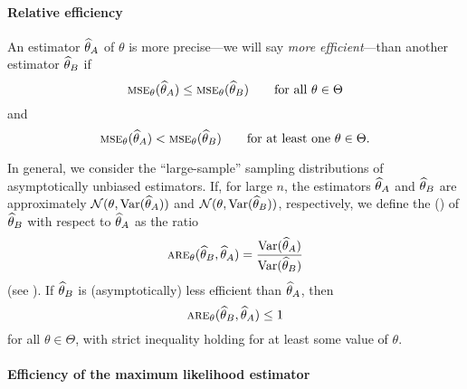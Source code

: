 \paragraph{Relative efficiency}

An estimator $\widehat{\theta}_A$ of $\theta$ is more precise---we will say
\emph{more efficient}---than another estimator $\widehat{\theta}_B$ if
\[
    \stsc{MSE}_{\theta}(\sthat{\theta}_A) \leq 
    \stsc{MSE}_{\theta}(\sthat{\theta}_B)
    \qquad\text{for all $\theta \in \Theta$}
\]
and                                                                    
\[
    \stsc{MSE}_{\theta}(\sthat{\theta}_A) < 
    \stsc{MSE}_{\theta}(\sthat{\theta}_B)
    \qquad\text{for at least one $\theta \in \Theta$}.
\]


In general, we consider the “large-sample” sampling distributions of
asymptotically unbiased estimators. If, for large $n$, the estimators
$\widehat{\theta}_A$ and $\widehat{\theta}_B$ are approximately
$\mathcal{N}(\theta, \textrm{Var}(\widehat{\theta}_A))$ and
$\mathcal{N}(\theta, \textrm{Var}(\widehat{\theta}_B))$, respectively, we
define the \emph{} () of
$\widehat{\theta}_B$ with respect to $\widehat{\theta}_A$ as the ratio
\[
    \stsc{ARE}_{\theta}(\sthat{\theta}_B,\sthat{\theta}_A) 
    = \frac{ \textrm{Var}(\sthat{\theta}_A)}{\textrm{Var}(\sthat{\theta}_B)}
\]
(see \citealp{Serfling1980}). If $\widehat{\theta}_B$ is (asymptotically) less
efficient than $\widehat{\theta}_A$, then
\[
    \stsc{ARE}_{\theta}(\sthat{\theta}_B,\sthat{\theta}_A) \leq 1
\]
for all $\theta \in \Theta$, with strict inequality holding for at least some value of $\theta$.


\paragraph{Efficiency of the maximum likelihood estimator}

